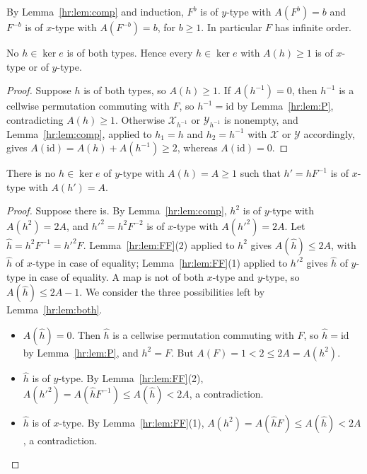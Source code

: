 By Lemma~\ref{hr:lem:comp} and induction, $F^b$ is of $y$-type with $A(F^b)=b$ and $F^{-b}$ is of $x$-type with $A(F^{-b})=b$, for $b\ge1$. In particular $F$ has infinite order.

\begin{lemma}\label{hr:lem:both}
No $h\in\ker e$ is of both types. Hence every $h\in\ker e$ with $A(h)\ge1$ is of $x$-type or of $y$-type.
\end{lemma}

\begin{proof}
Suppose $h$ is of both types, so $A(h)\ge1$. If $A(h^{-1})=0$, then $h^{-1}$ is a cellwise permutation commuting with $F$, so $h^{-1}=\mathrm{id}$ by Lemma~\ref{hr:lem:P}, contradicting $A(h)\ge1$. Otherwise $\mathcal X_{h^{-1}}$ or $\mathcal Y_{h^{-1}}$ is nonempty, and Lemma~\ref{hr:lem:comp}, applied to $h_1=h$ and $h_2=h^{-1}$ with $\mathcal X$ or $\mathcal Y$ accordingly, gives $A(\mathrm{id})=A(h)+A(h^{-1})\ge2$, whereas $A(\mathrm{id})=0$.
\end{proof}

\begin{lemma}\label{hr:lem:half}
There is no $h\in\ker e$ of $y$-type with $A(h)=A\ge1$ such that $h'=hF^{-1}$ is of $x$-type with $A(h')=A$.
\end{lemma}

\begin{proof}
Suppose there is. By Lemma~\ref{hr:lem:comp}, $h^2$ is of $y$-type with $A(h^2)=2A$, and $h'^2=h^2F^{-2}$ is of $x$-type with $A(h'^2)=2A$. Let $\hat h=h^2F^{-1}=h'^2F$. Lemma~\ref{hr:lem:FF}(2) applied to $h^2$ gives $A(\hat h)\le2A$, with $\hat h$ of $x$-type in case of equality; Lemma~\ref{hr:lem:FF}(1) applied to $h'^2$ gives $\hat h$ of $y$-type in case of equality. A map is not of both $x$-type and $y$-type, so $A(\hat h)\le2A-1$. We consider the three possibilities left by Lemma~\ref{hr:lem:both}.
\begin{itemize}
\item $A(\hat h)=0$. Then $\hat h$ is a cellwise permutation commuting with $F$, so $\hat h=\mathrm{id}$ by Lemma~\ref{hr:lem:P}, and $h^2=F$. But $A(F)=1<2\le2A=A(h^2)$.
\item $\hat h$ is of $y$-type. By Lemma~\ref{hr:lem:FF}(2), $A(h'^2)=A(\hat hF^{-1})\le A(\hat h)<2A$, a contradiction.
\item $\hat h$ is of $x$-type. By Lemma~\ref{hr:lem:FF}(1), $A(h^2)=A(\hat hF)\le A(\hat h)<2A$, a contradiction.\qedhere
\end{itemize}
\end{proof}

